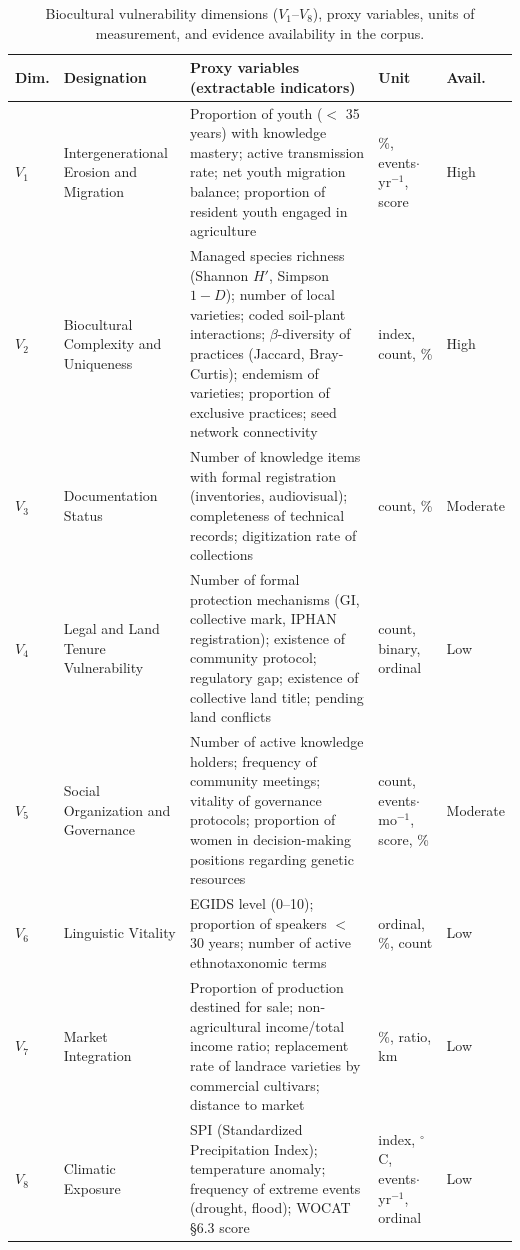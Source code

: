 \documentclass[12pt,a4paper]{article}
\begin{document}
\begin{table}[htbp]
\caption{Biocultural vulnerability dimensions ($V_1$--$V_8$), proxy variables, units of measurement, and evidence availability in the corpus.}
\label{tab:proxies}
\centering
\scriptsize
\begin{tabular}{p{0.7cm}p{2.2cm}p{4.0cm}p{2.0cm}p{1.3cm}}
\toprule
\textbf{Dim.} & \textbf{Designation} & \textbf{Proxy variables (extractable indicators)} & \textbf{Unit} & \textbf{Avail.} \\
\midrule
$V_1$ & Intergenerational Erosion and Migration & Proportion of youth ($<$ 35 years) with knowledge mastery; active transmission rate; net youth migration balance; proportion of resident youth engaged in agriculture & \%, events$\cdot$yr$^{-1}$, score & High \\
\addlinespace
$V_2$ & Biocultural Complexity and Uniqueness & Managed species richness (Shannon $H'$, Simpson $1-D$); number of local varieties; coded soil-plant interactions; $\beta$-diversity of practices (Jaccard, Bray-Curtis); endemism of varieties; proportion of exclusive practices; seed network connectivity & index, count, \% & High \\
\addlinespace
$V_3$ & Documentation Status & Number of knowledge items with formal registration (inventories, audiovisual); completeness of technical records; digitization rate of collections & count, \% & Moderate \\
\addlinespace
$V_4$ & Legal and Land Tenure Vulnerability & Number of formal protection mechanisms (GI, collective mark, IPHAN registration); existence of community protocol; regulatory gap; existence of collective land title; pending land conflicts & count, binary, ordinal & Low \\
\addlinespace
$V_5$ & Social Organization and Governance & Number of active knowledge holders; frequency of community meetings; vitality of governance protocols; proportion of women in decision-making positions regarding genetic resources & count, events$\cdot$mo$^{-1}$, score, \% & Moderate \\
\addlinespace
$V_6$ & Linguistic Vitality & EGIDS level (0--10); proportion of speakers $<$ 30 years; number of active ethnotaxonomic terms & ordinal, \%, count & Low \\
\addlinespace
$V_7$ & Market Integration & Proportion of production destined for sale; non-agricultural income/total income ratio; replacement rate of landrace varieties by commercial cultivars; distance to market & \%, ratio, km & Low \\
\addlinespace
$V_8$ & Climatic Exposure & SPI (Standardized Precipitation Index); temperature anomaly; frequency of extreme events (drought, flood); WOCAT \S6.3 score & index, $^\circ$C, events$\cdot$yr$^{-1}$, ordinal & Low \\
\bottomrule
\end{tabular}
\end{table}
\end{document}
